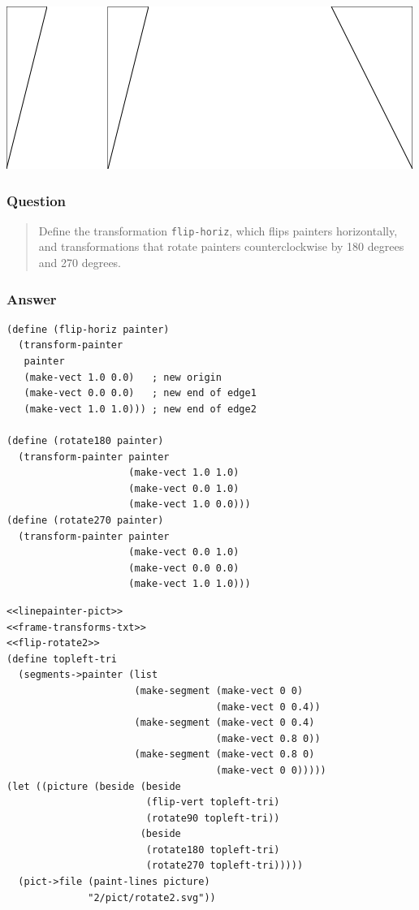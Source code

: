 \documentclass[final,fleqn,titlepage,twoside]{article}
\begin{document}
\begin{center}
\includegraphics[width=.9\linewidth]{2/pict/rotatetest.png}
\end{center}

\subsubsection{Question}
\label{sec:orgaf6d31b}
\begin{quote}
Define the transformation \texttt{flip-horiz}, which flips painters
horizontally, and transformations that rotate painters counterclockwise by 180
degrees and 270 degrees.
\end{quote}

\subsubsection{Answer}
\label{sec:orgda44021}
\begin{verbatim}
(define (flip-horiz painter)
  (transform-painter 
   painter
   (make-vect 1.0 0.0)   ; new origin
   (make-vect 0.0 0.0)   ; new end of edge1
   (make-vect 1.0 1.0))) ; new end of edge2

(define (rotate180 painter)
  (transform-painter painter
                     (make-vect 1.0 1.0)
                     (make-vect 0.0 1.0)
                     (make-vect 1.0 0.0)))
(define (rotate270 painter)
  (transform-painter painter
                     (make-vect 0.0 1.0)
                     (make-vect 0.0 0.0)
                     (make-vect 1.0 1.0)))
\end{verbatim}
\begin{verbatim}
<<linepainter-pict>>
<<frame-transforms-txt>>
<<flip-rotate2>>
(define topleft-tri
  (segments->painter (list
                      (make-segment (make-vect 0 0)
                                    (make-vect 0 0.4))
                      (make-segment (make-vect 0 0.4)
                                    (make-vect 0.8 0))
                      (make-segment (make-vect 0.8 0)
                                    (make-vect 0 0)))))
(let ((picture (beside (beside
                        (flip-vert topleft-tri)
                        (rotate90 topleft-tri))
                       (beside
                        (rotate180 topleft-tri)
                        (rotate270 topleft-tri)))))
  (pict->file (paint-lines picture)
              "2/pict/rotate2.svg"))
\end{verbatim}
\end{document}
